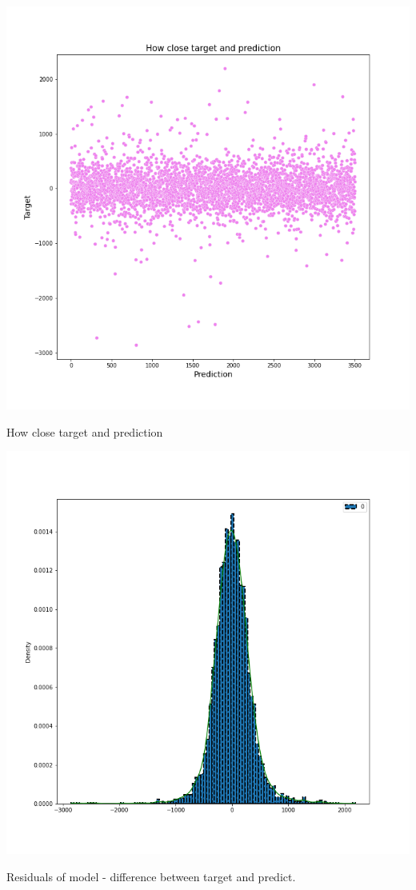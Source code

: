 \documentclass[%
12pt, %
final, %
oneside, %
onecolumn, %
centertags]{article} %
\theoremstyle{plain}
\theoremstyle{definition}
\theoremstyle{remark}
\begin{document}
\begin{center}
\includegraphics[scale=0.7]{images/target_predict.png}

How close target and prediction
\end{center}

\begin{center}
\includegraphics[scale=0.45]{images/residuals.png}

Residuals of model - difference between target and predict.
\end{center}
\end{document}
